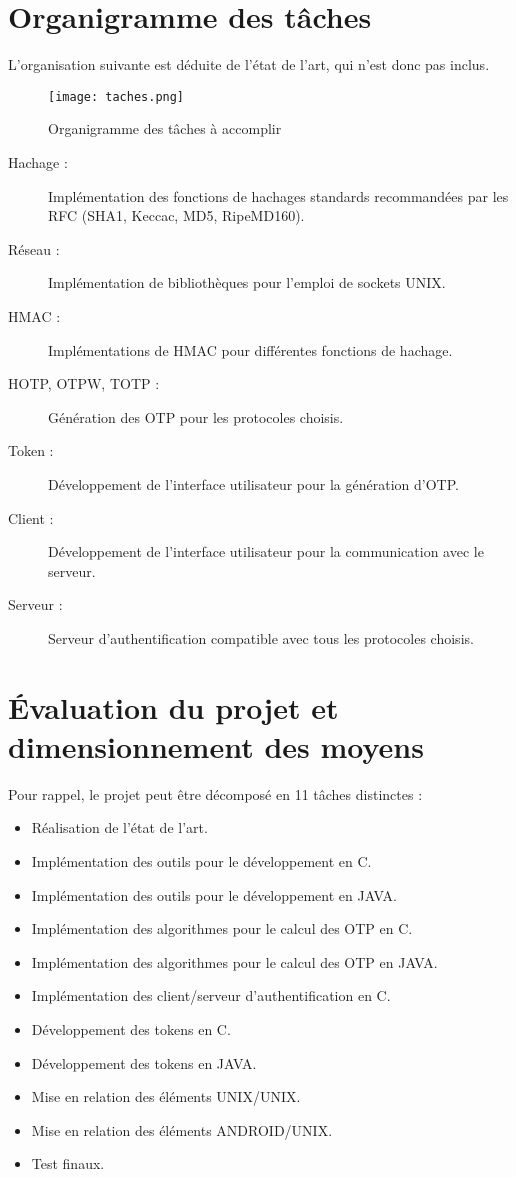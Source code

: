\documentclass{../../res/univ-projet}
\begin{document}
\section{Organigramme des t\^aches}
	L'organisation suivante est déduite de l'état de l'art, qui n'est donc pas inclus.
	\begin{figure}[h]
	\texttt{[image: taches.png]}
	\caption{Organigramme des tâches à accomplir}
	\end{figure}
	\begin{description}
	\item[Hachage :]Implémentation des fonctions de hachages standards recommandées par les RFC (SHA1, Keccac, MD5, RipeMD160).
	\item[Réseau :]Implémentation de bibliothèques pour l'emploi de sockets UNIX.
	\item[HMAC :]Implémentations de HMAC pour différentes fonctions de hachage.
	\item[HOTP, OTPW, TOTP :]Génération des OTP pour les protocoles choisis.
	\item[Token :]Développement de l'interface utilisateur pour la génération d'OTP.
	\item[Client :]Développement de l'interface utilisateur pour la communication avec le serveur.
	\item[Serveur :]Serveur d'authentification compatible avec tous les protocoles choisis.
	\end{description}
\newpage
\section{Évaluation du projet et dimensionnement des moyens}
	Pour rappel, le projet peut être décomposé en 11 tâches distinctes :
	\begin{itemize}
	  \item Réalisation de l'état de l'art.
	  \item Implémentation des outils pour le développement en C.
	  \item Implémentation des outils pour le développement en JAVA.
	  \item Implémentation des algorithmes pour le calcul des OTP en C.
	  \item Implémentation des algorithmes pour le calcul des OTP en JAVA.
	  \item Implémentation des client/serveur d'authentification en C.
	  \item Développement des tokens en C.
	  \item Développement des tokens en JAVA.
	  \item Mise en relation des éléments UNIX/UNIX.
	  \item Mise en relation des éléments ANDROID/UNIX.
	  \item Test finaux.
	\end{itemize}
\end{document}
